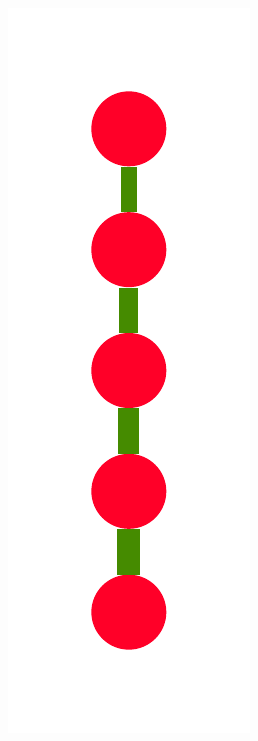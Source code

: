 \documentclass[a4paper,10pt]{article}
\begin{document}
\begin{figure}
{    \includegraphics[scale=.14]{./figures/6-3-recursion-data-4.pdf}
}
\end{figure}
\end{document}
